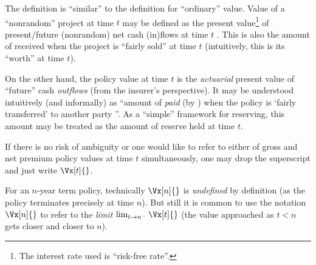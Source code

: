 \begin{enumerate}
\begin{intuition}
The definition is ``similar'' to the definition for ``ordinary'' value. Value
of a ``nonrandom'' project at time \(t\) may be defined as the present
value\footnote{The interest rate used is ``risk-free rate''.} of present/future
(nonrandom) net cash (in)flows at time \(t\) . This is also the amount of
 received when the project is ``fairly sold'' at time \(t\)
(intuitively, this is its ``worth'' at time \(t\)).

On the other hand, the policy value at time \(t\) is the \emph{actuarial}
present value of ``future'' cash \emph{outflows} (from the insurer's
 perspective). It may be understood intuitively (and
informally) as ``amount of  \emph{paid} (by )
when the policy  is `fairly transferred' to another party
''. As a ``simple'' framework for reserving, this
amount  may be treated as the amount of reserve held at time
\(t\).
\end{intuition}

\begin{remark}
\item If there is no risk of ambiguity or one would like to refer to either of gross
and net premium policy values at time \(t\) simultaneously, one may drop the
superscript and just write \(\Vx[t]{}\).

\item \ystar{} For an \(n\)-year term policy, technically  \(\Vx[n]{}\) is
\emph{undefined} by definition (as the policy terminates precisely at time
\(n\)). But still it is common to use the notation \(\Vx[n]{}\) to refer to the
\emph{limit} \(\lim_{t\to n^{-}}\Vx[t]{}\) (the value approached as \(t<n\)
gets closer and closer to \(n\)).
\end{remark}


\end{enumerate}
